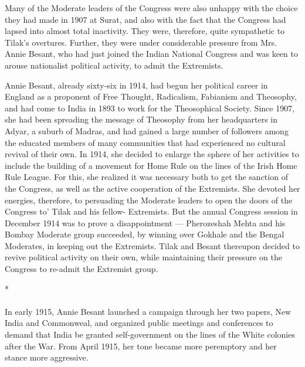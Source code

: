 Many of the Moderate leaders of the Congress were also unhappy with the choice they had made in 1907 at Surat, and also with the fact that the Congress had lapsed into almost total inactivity. They were, therefore, quite sympathetic to Tilak's overtures. Further, they were under considerable pressure from Mrs. Annie Besant, who had just joined the Indian National Congress and was keen to arouse nationalist political activity, to admit the Extremists.

Annie Besant, already sixty-six in 1914, had begun her political career in England as a proponent of Free Thought, Radicalism, Fabianism and Theosophy, and had come to India in 1893 to work for the Theosophical Society. Since 1907, she had been spreading the message of Theosophy from her headquarters in Adyar, a suburb of Madras, and had gained a large number of followers among the educated members of many communities that had experienced no cultural revival of their own. In 1914, she decided to enlarge the sphere of her activities to include the building of a movement for Home Rule on the lines of the Irish Home Rule League. For this, she realized it was necessary both to get the sanction of the Congress, as well as the active cooperation of the Extremists. She devoted her energies, therefore, to persuading the Moderate leaders to open the doors of the Congress to' Tilak and his fellow- Extremists. But the annual Congress session in December 1914 was to prove a disappointment — Pherozeshah Mehta and his Bombay Moderate group succeeded, by winning over Gokhale and the Bengal Moderates, in keeping out the Extremists. Tilak and Besant thereupon decided to revive political activity on their own, while maintaining their pressure on the Congress to re-admit the Extremist group.

\begin{center}*\end{center}

\paragraph*{}


In early 1915, Annie Besant launched a campaign through her two papers, New India and Commonweal, and organized public meetings and conferences to demand that India be granted self-government on the lines of the White colonies after the War. From April 1915, her tone became more peremptory and her stance more aggressive.

